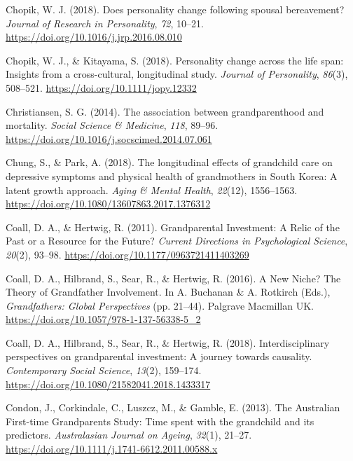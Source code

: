 \documentclass[
  english,
  man,floatsintext]{apa7}
\begin{document}
\leavevmode\hypertarget{ref-chopikDoesPersonalityChange2018}{}%
Chopik, W. J. (2018). Does personality change following spousal bereavement? \emph{Journal of Research in Personality}, \emph{72}, 10--21. \url{https://doi.org/10.1016/j.jrp.2016.08.010}

\leavevmode\hypertarget{ref-chopikPersonalityChangeLife2018}{}%
Chopik, W. J., \& Kitayama, S. (2018). Personality change across the life span: Insights from a cross-cultural, longitudinal study. \emph{Journal of Personality}, \emph{86}(3), 508--521. \url{https://doi.org/10.1111/jopy.12332}

\leavevmode\hypertarget{ref-christiansenAssociationGrandparenthoodMortality2014}{}%
Christiansen, S. G. (2014). The association between grandparenthood and mortality. \emph{Social Science \& Medicine}, \emph{118}, 89--96. \url{https://doi.org/10.1016/j.socscimed.2014.07.061}

\leavevmode\hypertarget{ref-chungLongitudinalEffectsGrandchild2018}{}%
Chung, S., \& Park, A. (2018). The longitudinal effects of grandchild care on depressive symptoms and physical health of grandmothers in South Korea: A latent growth approach. \emph{Aging \& Mental Health}, \emph{22}(12), 1556--1563. \url{https://doi.org/10.1080/13607863.2017.1376312}

\leavevmode\hypertarget{ref-coallGrandparentalInvestmentRelic2011}{}%
Coall, D. A., \& Hertwig, R. (2011). Grandparental Investment: A Relic of the Past or a Resource for the Future? \emph{Current Directions in Psychological Science}, \emph{20}(2), 93--98. \url{https://doi.org/10.1177/0963721411403269}

\leavevmode\hypertarget{ref-coallNewNicheTheory2016}{}%
Coall, D. A., Hilbrand, S., Sear, R., \& Hertwig, R. (2016). A New Niche? The Theory of Grandfather Involvement. In A. Buchanan \& A. Rotkirch (Eds.), \emph{Grandfathers: Global Perspectives} (pp. 21--44). Palgrave Macmillan UK. \url{https://doi.org/10.1057/978-1-137-56338-5_2}

\leavevmode\hypertarget{ref-coallInterdisciplinaryPerspectivesGrandparental2018}{}%
Coall, D. A., Hilbrand, S., Sear, R., \& Hertwig, R. (2018). Interdisciplinary perspectives on grandparental investment: A journey towards causality. \emph{Contemporary Social Science}, \emph{13}(2), 159--174. \url{https://doi.org/10.1080/21582041.2018.1433317}

\leavevmode\hypertarget{ref-condonAustralianFirsttimeGrandparents2013}{}%
Condon, J., Corkindale, C., Luszcz, M., \& Gamble, E. (2013). The Australian First-time Grandparents Study: Time spent with the grandchild and its predictors. \emph{Australasian Journal on Ageing}, \emph{32}(1), 21--27. \url{https://doi.org/10.1111/j.1741-6612.2011.00588.x}
\end{document}
